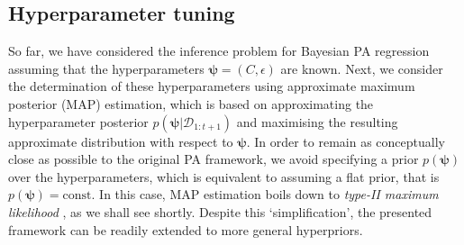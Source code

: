 
\subsection{Hyperparameter tuning}
\label{sec:hyperparameter-tuning}

So far, we have considered the inference problem for Bayesian PA regression assuming that the hyperparameters $\boldsymbol{\psi} = (C, \epsilon)$ are known. Next, we consider the determination of these hyperparameters using approximate maximum posterior (MAP) estimation, which is based on approximating the hyperparameter posterior $p(\boldsymbol{\psi}|\mathcal{D}_{1:t+1})$ and maximising the resulting approximate distribution with respect to $\boldsymbol{\psi}$. In order to remain as conceptually close as possible to the original PA framework, we avoid specifying a prior $p(\boldsymbol{\psi})$ over the hyperparameters, which is equivalent to assuming a flat prior, that is $p(\boldsymbol{\psi}) = \text{const}$. In this case, MAP estimation boils down to \emph{type-II maximum likelihood} \citep{berger85, mackay92a}, as we shall see shortly. Despite this `simplification', the presented framework can be readily extended to more general hyperpriors.

